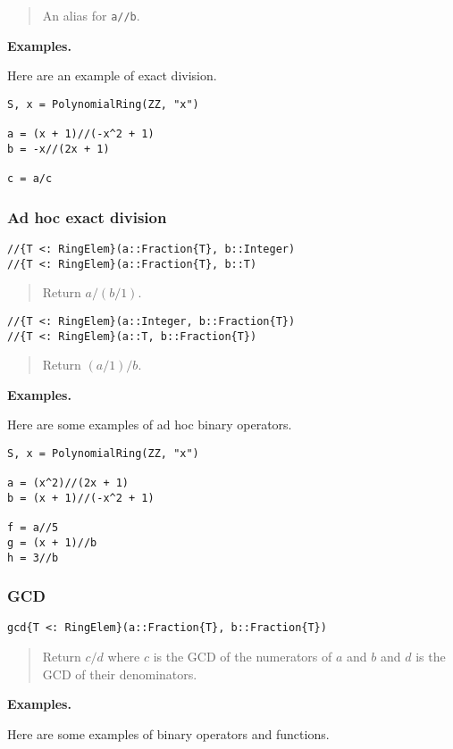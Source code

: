 \documentclass[a4paper,10pt]{article}
\newcommand{\code}{\lstinline}
\newcommand{\desc}[1]{\vspace{-3mm}\begin{quote}#1\end{quote}}
\begin{document}
\desc{An alias for \code{a//b}.}

\textbf{Examples.}

Here are an example of exact division.

\begin{lstlisting}
S, x = PolynomialRing(ZZ, "x")

a = (x + 1)//(-x^2 + 1) 
b = -x//(2x + 1)

c = a/c
\end{lstlisting}

\subsubsection{Ad hoc exact division}

\begin{lstlisting}
//{T <: RingElem}(a::Fraction{T}, b::Integer)
//{T <: RingElem}(a::Fraction{T}, b::T)
\end{lstlisting}

\desc{Return $a / (b/1)$.}

\begin{lstlisting}
//{T <: RingElem}(a::Integer, b::Fraction{T})
//{T <: RingElem}(a::T, b::Fraction{T})
\end{lstlisting}

\desc{Return $(a/1) / b$.}

\textbf{Examples.}

Here are some examples of ad hoc binary operators.

\begin{lstlisting}
S, x = PolynomialRing(ZZ, "x")

a = (x^2)//(2x + 1)
b = (x + 1)//(-x^2 + 1)

f = a//5
g = (x + 1)//b
h = 3//b
\end{lstlisting}

\subsubsection{GCD}

\begin{lstlisting}
gcd{T <: RingElem}(a::Fraction{T}, b::Fraction{T})
\end{lstlisting}

\desc{Return $c/d$ where $c$ is the GCD of the numerators of $a$ and $b$ and
$d$ is the GCD of their denominators.}

\textbf{Examples.}

Here are some examples of binary operators and functions.
\end{document}
